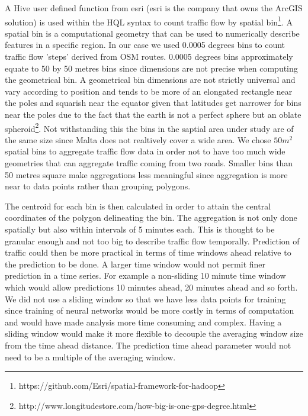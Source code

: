 \documentclass[12pt, a4paper]{report}
\theoremstyle{definition}
\theoremstyle{definition}%
\theoremstyle{definition}%
\theoremstyle{definition}%
\theoremstyle{definition}%
\theoremstyle{definition}%
\begin{document}
A Hive user defined function from esri (esri is the company that owns the ArcGIS solution) is used within the HQL syntax to count traffic flow by spatial bin\footnote{https://github.com/Esri/spatial-framework-for-hadoop}. A spatial bin is a computational geometry that can be used to numerically describe features in a specific region. In our case we used 0.0005 degrees bins to count traffic flow 'steps' derived from OSM routes. 0.0005 degrees bins approximately equate to 50 by 50 metres bins since dimensions are not precise when computing the geometrical bin. A geometrical bin dimensions are not strictly universal and vary according to position and tends to be more of an elongated rectangle near the poles and squarish near the equator given that latitudes get narrower for bins near the poles due to the fact that the earth is not a perfect sphere but an oblate spheroid\footnote{http://www.longitudestore.com/how-big-is-one-gps-degree.html}. Not withstanding this the bins in the saptial area under study are of the same size since Malta does not realtively cover a wide area. We chose $50m^2$ spatial bins to aggregate traffic flow data in order not to have too much wide geometries that can aggregate traffic coming from two roads. Smaller bins than 50 metres square make aggregations less meaningful since aggregation is more near to data points rather than grouping polygons. 

The centroid for each bin is then calculated in order to attain the central coordinates of the polygon delineating the bin. The aggregation is not only done spatially but also within intervals of 5 minutes each. This is thought to be granular enough and not too big to describe traffic flow temporally. Prediction of traffic could then be more practical in terms of time windows ahead relative to the prediction to be done. A larger time window would not permit finer prediction in a time series. For example a non-sliding 10 minute time window which would allow predictions 10 minutes ahead, 20 minutes ahead and so forth. We did not use a sliding window so that we have less data points for training since training of neural networks would be more costly in terms of computation and would have made analysis more time consuming and complex. Having a sliding window would make it more flexible to decouple the averaging window size from the time ahead distance. The prediction time ahead parameter would not need to be a multiple of the averaging window. 

  
\end{document}
